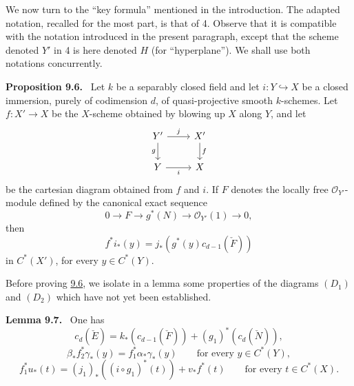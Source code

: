\documentclass[11pt]{article}
\newenvironment{statement}[1]{\par\medskip\noindent\textbf{#1.}\ }{\par\medskip}
\begin{document}
We now turn to the ``key formula'' mentioned in the introduction. The adapted notation, recalled for the most part, is that of 4. Observe that it is compatible with the notation introduced in the present paragraph, except that the scheme denoted $Y'$ in 4 is here denoted $H$ (for ``hyperplane''). We shall use both notations concurrently.

\label{sga5:VII:proposition:9.6}\begin{statement}{Proposition 9.6}
Let $k$ be a separably closed field and let $i:Y\hookrightarrow X$ be a closed immersion, purely of codimension $d$, of quasi-projective smooth $k$-schemes. Let $f:X'\to X$ be the $X$-scheme obtained by blowing up $X$ along $Y$, and let
\[
\begin{tikzcd}
Y'\arrow[r,"j"]\arrow[d,"g"']&X'\arrow[d,"f"]\\
Y\arrow[r,"i"']&X
\end{tikzcd}
\]
be the cartesian diagram obtained from $f$ and $i$. If $F$ denotes the locally free $\mathcal O_{Y'}$-module defined by the canonical exact sequence
\[
0\to F\to g^*(N)\to\mathcal O_{Y'}(1)\to0,
\tag{9.6.1}\label{sga5:VII:equation:9.6.1}
\]
then
\[
f^*i_*(y)=j_*(g^*(y)c_{d-1}(\check F))
\tag{9.6.2}\label{sga5:VII:equation:9.6.2}
\]
in $C^*(X')$, for every $y\in C^*(Y)$.
\end{statement}

Before proving \hyperref[sga5:VII:proposition:9.6]{9.6}, we isolate in a lemma some properties of the diagrams $(D_1)$ and $(D_2)$ which have not yet been established.

\label{sga5:VII:lemma:9.7}\begin{statement}{Lemma 9.7}
One has
\[
c_d(\check E)=k_*(c_{d-1}(\check F))+(g_1)^*(c_d(\check N)),
\tag{9.7 i}\label{sga5:VII:equation:9.7-i}
\]
\[
\beta_*f_2^*\gamma_*(y)=f_1^*\alpha_*\gamma_*(y)\qquad\text{for every }y\in C^*(Y),
\tag{9.7 ii}\label{sga5:VII:equation:9.7-ii}
\]
\[
f_1^*u_*(t)=(j_1)_*((i\circ g_1)^*(t))+v_*f^*(t)\qquad\text{for every }t\in C^*(X).
\tag{9.7 iii}\label{sga5:VII:equation:9.7-iii}
\]
\end{statement}
\end{document}

